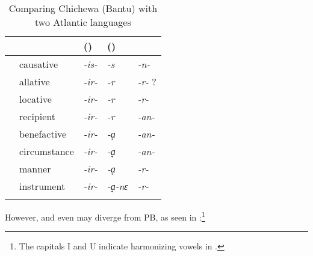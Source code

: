 \documentclass[output=paper]{langsci/langscibook}
\begin{document}
\begin{table}[p]
\begin{tabularx}{\textwidth}{llQQQ}
\lsptoprule
& & 
{  (\citealt{HymanMchombo1992})} &
{  (\citealt{Wilson1961,Kanu2004})} &
{  \citep{Arnott1970}}\\
\midrule
	       & causative & \textit{-is-} & \textit{-s} & \textit{-n-}\\
\hhline{~~---} & allative & \textit{-ir-} & \textit{-r} & \textit{-r-} ?\\
	       & locative & \textit{-ir-} & \textit{-r} & \textit{-r-}\\
\hhline{~~~~-} & recipient & \textit{-ir-} & \textit{-r} & \textit{-an-}\\
\hhline{~~~-~} & benefactive & \textit{-ir-} & \textit{-a̘} & \textit{-an-}\\
	       & circumstance & \textit{-ir-} & \textit{-a̘} & \textit{-an-}\\
\hhline{~~~~-} & manner & \textit{-ir-} & \textit{-a̘} & \textit{-r-}\\
\hhline{~~~-~} & instrument & \textit{-ir-} & \textit{-a̘-nɛ} & \textit{-r-}\\
\hhline{~~---}
\lspbottomrule
\end{tabularx}
\caption{Comparing Chichewa (Bantu) with two Atlantic languages}
\label{extab:proto:6}
\end{table}

However,  and even  may diverge from PB, as seen in  \citep[160]{Hyman2007}:\footnote{The capitals I and U indicate harmonizing vowels in .}
\end{document}
